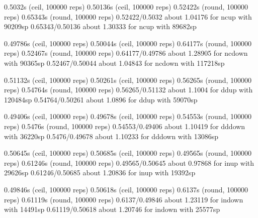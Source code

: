 0.5032s (ceil, 100000 reps)                             0.50136s (ceil, 100000 reps)                           
0.52422s (round, 100000 reps)                           0.65343s (round, 100000 reps)                          
0.52422/0.5032 about 1.04176 for ncup with 90209sp      0.65343/0.50136 about 1.30333 for ncup with 89682sp    
                                                                                                               
0.49786s (ceil, 100000 reps)                            0.50044s (ceil, 100000 reps)                           
0.64177s (round, 100000 reps)                           0.52467s (round, 100000 reps)                          
0.64177/0.49786 about 1.28905 for ncdown with 90365sp   0.52467/0.50044 about 1.04843 for ncdown with 117218sp 
                                                                                                               
0.51132s (ceil, 100000 reps)                            0.50261s (ceil, 100000 reps)                           
0.56265s (round, 100000 reps)                           0.54764s (round, 100000 reps)                          
0.56265/0.51132 about 1.1004 for ddup with 120484sp     0.54764/0.50261 about 1.0896 for ddup with 59070sp     
                                                                                                               
0.49406s (ceil, 100000 reps)                            0.49678s (ceil, 100000 reps)                           
0.54553s (round, 100000 reps)                           0.5476s (round, 100000 reps)                           
0.54553/0.49406 about 1.10419 for dddown with 36220sp   0.5476/0.49678 about 1.10233 for dddown with 13086sp   
                                                                                                               
0.50645s (ceil, 100000 reps)                            0.50685s (ceil, 100000 reps)                           
0.49565s (round, 100000 reps)                           0.61246s (round, 100000 reps)                          
0.49565/0.50645 about 0.97868 for inup with 29626sp     0.61246/0.50685 about 1.20836 for inup with 19392sp    
                                                                                                               
0.49846s (ceil, 100000 reps)                            0.50618s (ceil, 100000 reps)                           
0.6137s (round, 100000 reps)                            0.61119s (round, 100000 reps)                          
0.6137/0.49846 about 1.23119 for indown with 14491sp    0.61119/0.50618 about 1.20746 for indown with 25577sp  
                                                                                                               
